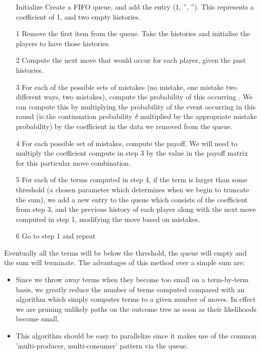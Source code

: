 \documentclass[a4paper,11pt]{article}
\begin{document}
\begin{enumerate}
    \item[Initialize] Create a FIFO queue, and add the entry (1, '', ''). This represents a coefficient of 1, and two empty histories.
    \item[1] Remove the first item from the queue. Take the histories and initialise the players to have those histories.
    \item[2] Compute the next move that would occur for each player, given the past histories.
    \item[3] For each of the possible sets of mistakes (no mistake, one mistake two different ways, two mistakes), compute the probability of this occurring . We can compute this by multiplying the probability of the event occurring in this round (ie.the continuation probability $\delta$ multiplied by the appropriate mistake probability) by the coefficient in the data we removed from the queue.
    \item[4] For each possible set of mistakes, compute the payoff. We will need to multiply the coefficient compute in step 3 by the value in the payoff matrix for this particular move combination.
    \item[5] For each of the terms computed in step 4, if the term is larger than some threshold (a chosen parameter which determines when we begin to truncate the sum), we add a new entry to the queue which consists of the coefficient from step 3, and the previous history of each player along with the next move computed in step 1, modifying the move based on mistakes.
    \item[6] Go to step 1 and repeat
\end{enumerate}

Eventually all the terms will be below the threshold, the queue will empty and the sum will terminate.
The advantages of this method over a simple sum are:

\begin{itemize}

    \item Since we throw away terms when they become too small on a term-by-term basis, we greatly reduce the number of terms computed compared with an algorithm which simply computes terms to a given number of moves. In effect we are pruning unlikely paths on the outcome tree as soon as their likelihoods become small.
    \item This algorithm should be easy to parallelize since it makes use of the common 'multi-producer, multi-consumer' pattern via the queue.

\end{itemize}
\end{document}
